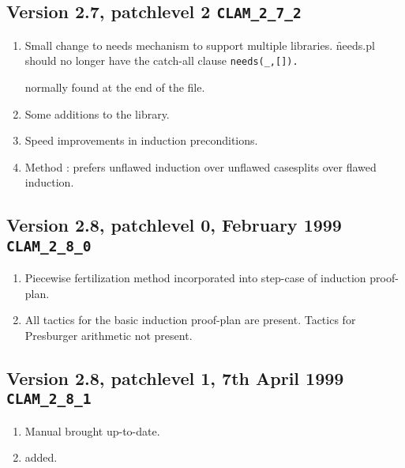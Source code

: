 \subsection {Version 2.7, patchlevel 2 {\tt CLAM\_2\_7\_2}}
\begin{enumerate}
        \item  Small change to needs mechanism to support multiple
          libraries.  \f{needs.pl} should no longer have the catch-all
          clause  \verb|needs(_,[]).|

          normally found at the end of the file.
        \item  Some additions to the library.
        \item  Speed improvements in induction preconditions.
        \item  Method : prefers unflawed induction over unflawed
          casesplits over flawed induction.        
\end{enumerate}

\subsection {Version 2.8, patchlevel 0, February 1999 {\tt CLAM\_2\_8\_0}}
\begin{enumerate}
\item  Piecewise fertilization method  incorporated into step-case
          of induction proof-plan.
        \item All tactics for the basic induction proof-plan are present.
          Tactics for Presburger arithmetic not present.
\end{enumerate}

\subsection {Version 2.8, patchlevel 1, 7th April 1999 {\tt CLAM\_2\_8\_1}}
\begin{enumerate}
\item Manual brought up-to-date.
\item {} added.
\end{enumerate}

